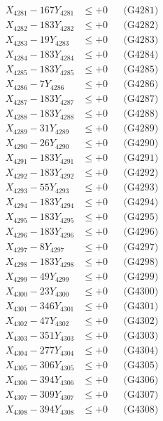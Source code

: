 \documentclass[a4paper,10pt]{article}
\begin{document}
{\begin{align}
\allowbreak
X_{4281} - 167Y_{4281} &\leq +0 && \text{(G4281)} \\
X_{4282} - 183Y_{4282} &\leq +0 && \text{(G4282)} \\
X_{4283} - 19Y_{4283} &\leq +0 && \text{(G4283)} \\
X_{4284} - 183Y_{4284} &\leq +0 && \text{(G4284)} \\
X_{4285} - 183Y_{4285} &\leq +0 && \text{(G4285)} \\
X_{4286} - 7Y_{4286} &\leq +0 && \text{(G4286)} \\
X_{4287} - 183Y_{4287} &\leq +0 && \text{(G4287)} \\
X_{4288} - 183Y_{4288} &\leq +0 && \text{(G4288)} \\
X_{4289} - 31Y_{4289} &\leq +0 && \text{(G4289)} \\
X_{4290} - 26Y_{4290} &\leq +0 && \text{(G4290)} \\
\allowbreak
X_{4291} - 183Y_{4291} &\leq +0 && \text{(G4291)} \\
X_{4292} - 183Y_{4292} &\leq +0 && \text{(G4292)} \\
X_{4293} - 55Y_{4293} &\leq +0 && \text{(G4293)} \\
X_{4294} - 183Y_{4294} &\leq +0 && \text{(G4294)} \\
X_{4295} - 183Y_{4295} &\leq +0 && \text{(G4295)} \\
X_{4296} - 183Y_{4296} &\leq +0 && \text{(G4296)} \\
X_{4297} - 8Y_{4297} &\leq +0 && \text{(G4297)} \\
X_{4298} - 183Y_{4298} &\leq +0 && \text{(G4298)} \\
X_{4299} - 49Y_{4299} &\leq +0 && \text{(G4299)} \\
X_{4300} - 23Y_{4300} &\leq +0 && \text{(G4300)} \\
\allowbreak
X_{4301} - 346Y_{4301} &\leq +0 && \text{(G4301)} \\
X_{4302} - 47Y_{4302} &\leq +0 && \text{(G4302)} \\
X_{4303} - 351Y_{4303} &\leq +0 && \text{(G4303)} \\
X_{4304} - 277Y_{4304} &\leq +0 && \text{(G4304)} \\
X_{4305} - 306Y_{4305} &\leq +0 && \text{(G4305)} \\
X_{4306} - 394Y_{4306} &\leq +0 && \text{(G4306)} \\
X_{4307} - 309Y_{4307} &\leq +0 && \text{(G4307)} \\
X_{4308} - 394Y_{4308} &\leq +0 && \text{(G4308)} \\

\end{align}}
\end{document}
